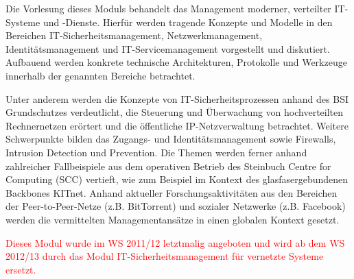 \begin{module}
\begin{learningoutcomes}
\end{learningoutcomes}

\begin{content}
Die Vorlesung dieses Moduls behandelt das Management moderner, verteilter IT-Systeme und -Dienste. Hierfür werden tragende Konzepte und Modelle in den Bereichen IT-Sicherheitsmanagement, Netzwerkmanagement, Identitätsmanagement und IT-Servicemanagement vorgestellt und diskutiert. Aufbauend werden konkrete technische Architekturen, Protokolle und Werkzeuge innerhalb der genannten Bereiche betrachtet.

 

Unter anderem werden die Konzepte von IT-Sicherheitsprozessen anhand des BSI Grundschutzes verdeutlicht, die Steuerung und Überwachung von hochverteilten Rechnernetzen erörtert und die öffentliche IP-Netzverwaltung betrachtet. Weitere Schwerpunkte bilden das Zugangs- und Identitätsmanagement sowie Firewalls, Intrusion Detection und Prevention. Die Themen werden ferner anhand zahlreicher Fallbeispiele aus dem operativen Betrieb des Steinbuch Centre for Computing (SCC) vertieft, wie zum Beispiel im Kontext des glasfasergebundenen Backbones KITnet. Anhand aktueller Forschungsaktivitäten aus den Bereichen der Peer-to-Peer-Netze (z.B. BitTorrent) und sozialer Netzwerke (z.B. Facebook) werden die vermittelten Managementansätze in einen globalen Kontext gesetzt.


\end{content}

\begin{remarks}\textcolor{red}{Dieses Modul wurde im WS 2011/12 letztmalig angeboten und wird ab dem WS 2012/13 durch das Modul IT-Sicherheitsmanagement für vernetzte Systeme ersetzt.}

\end{remarks}

\end{module}

